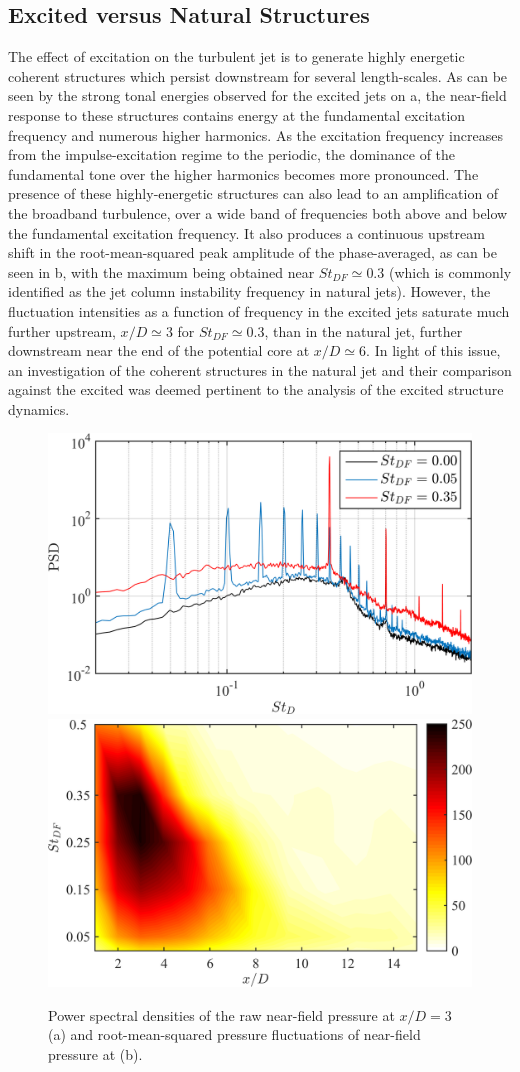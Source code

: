 \subsection{Excited versus Natural Structures}
The effect of excitation on the turbulent jet is to generate highly energetic coherent structures which persist downstream for several length-scales.
As can be seen by the strong tonal energies observed for the excited jets on a, the near-field response to these structures contains energy at the fundamental excitation frequency and numerous higher harmonics.
As the excitation frequency increases from the impulse-excitation regime to the periodic, the dominance of the fundamental tone over the higher harmonics becomes more pronounced.
The presence of these highly-energetic structures can also lead to an amplification of the broadband turbulence, over a wide band of frequencies both above and below the fundamental excitation frequency.
It also produces a continuous upstream shift in the root-mean-squared peak amplitude of the phase-averaged, as can be seen in b, with the maximum being obtained near $St_{DF} \simeq 0.3$ (which is commonly identified as the jet column instability frequency in natural jets).
However, the fluctuation intensities as a function of frequency in the excited jets saturate much further upstream, $x/D \simeq 3$ for $St_{DF} \simeq 0.3$,  than in the natural jet, further downstream near the end of the potential core at $x/D \simeq 6$.
In light of this issue, an investigation of the coherent structures in the natural jet and their comparison against the excited was deemed pertinent to the analysis of the excited structure dynamics.
\begin{figure}
	\centering
	\includegraphics[width=0.44\linewidth]{Figures/sect_nearfield_spectra.png}
	\includegraphics[width=0.46\linewidth]{Figures/sect_nearfield_prms.png}
	\caption{Power spectral densities of the raw near-field pressure at $x/D = 3$ (a) and root-mean-squared pressure fluctuations of near-field pressure at (b).}
	\label{fig:sect_nearfield_spectra_prms}
\end{figure}

